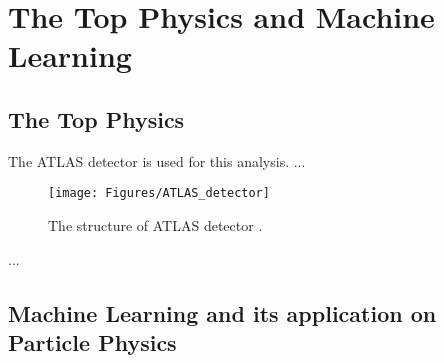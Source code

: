 \chapter{The Top Physics and Machine Learning}

\section{The Top Physics}

The ATLAS detector \cite{ATLAS:2014aga, Detector} is used for this analysis. ...

\begin{figure}
	\centering
	\texttt{[image: Figures/ATLAS\_detector]}
	\caption{The structure of ATLAS detector \cite{Detector}.}
	\label{fig:ATLAS_detector}
\end{figure}
...

\section{Machine Learning and its application on Particle Physics}
